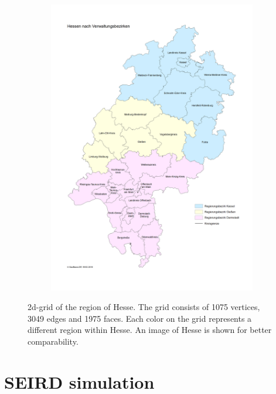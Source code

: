 \begin{figure}
\begin{center}
\begin{subfigure}[b]{0.4\textwidth}
			\includegraphics[width=\textwidth]{./figures/Hessen.png}
		\end{subfigure}
	\end{center}
	\caption{2d-grid of the region of Hesse. The grid consists of 1075 vertices, 3049 edges and 1975 faces.
		Each color on the grid represents a different region within Hesse. An image of Hesse is shown
		for better comparability\cite{website}.}
	\label{fig:2d-grid}
\end{figure}



\section{SEIRD simulation}

